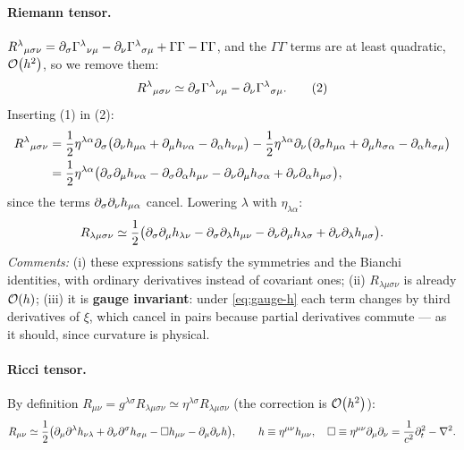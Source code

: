 \paragraph{Riemann tensor.} $R^{\lambda}{}_{\mu\sigma\nu}=\partial_\sigma\Gamma^{\lambda}{}_{\nu\mu}-\partial_\nu\Gamma^{\lambda}{}_{\sigma\mu}+\Gamma\Gamma-\Gamma\Gamma$, and the $\Gamma\Gamma$ terms are at least quadratic, $\mathcal{O}\!\left(h^2\right)$, so we remove them:
\begin{equation}
  R^{\lambda}{}_{\mu\sigma\nu}\simeq\partial_\sigma\Gamma^{\lambda}{}_{\nu\mu}-\partial_\nu\Gamma^{\lambda}{}_{\sigma\mu}.\tag{2}
\end{equation}
Inserting (1) in (2):
\begin{align*}
  R^{\lambda}{}_{\mu\sigma\nu}&=\frac12\eta^{\lambda\alpha}\partial_\sigma\big(\partial_\nu h_{\mu\alpha}+\partial_\mu h_{\nu\alpha}-\partial_\alpha h_{\nu\mu}\big)-\frac12\eta^{\lambda\alpha}\partial_\nu\big(\partial_\sigma h_{\mu\alpha}+\partial_\mu h_{\sigma\alpha}-\partial_\alpha h_{\sigma\mu}\big)\\
  &=\frac12\eta^{\lambda\alpha}\big(\partial_\sigma\partial_\mu h_{\nu\alpha}-\partial_\sigma\partial_\alpha h_{\mu\nu}-\partial_\nu\partial_\mu h_{\sigma\alpha}+\partial_\nu\partial_\alpha h_{\mu\sigma}\big),
\end{align*}
since the terms $\partial_\sigma\partial_\nu h_{\mu\alpha}$ cancel. Lowering $\lambda$ with $\eta_{\lambda\alpha}$:
\begin{equation}
  R_{\lambda\mu\sigma\nu}\simeq\frac12\big(\partial_\sigma\partial_\mu h_{\lambda\nu}-\partial_\sigma\partial_\lambda h_{\mu\nu}-\partial_\nu\partial_\mu h_{\lambda\sigma}+\partial_\nu\partial_\lambda h_{\mu\sigma}\big).
\end{equation}
\textit{Comments:} (i) these expressions satisfy the symmetries and the Bianchi identities, with ordinary derivatives instead of covariant ones; (ii) $R_{\lambda\mu\sigma\nu}$ is already $\mathcal{O}\!\left(h\right)$; (iii) it is \textbf{gauge invariant}: under \eqref{eq:gauge-h} each term changes by third derivatives of $\xi$, which cancel in pairs because partial derivatives commute --- as it should, since curvature is physical.

\paragraph{Ricci tensor.} By definition $R_{\mu\nu}=g^{\lambda\sigma}R_{\lambda\mu\sigma\nu}\simeq\eta^{\lambda\sigma}R_{\lambda\mu\sigma\nu}$ (the correction is $\mathcal{O}\!\left(h^2\right)$):
\begin{equation}
  R_{\mu\nu}\simeq\frac12\big(\partial_\mu\partial^\lambda h_{\nu\lambda}+\partial_\nu\partial^\sigma h_{\sigma\mu}-\square h_{\mu\nu}-\partial_\mu\partial_\nu h\big),
  \qquad h\equiv\eta^{\mu\nu}h_{\mu\nu},\quad\square\equiv\eta^{\mu\nu}\partial_\mu\partial_\nu=\frac{1}{c^2}\partial_t^2-\nabla^2 .
\end{equation}
